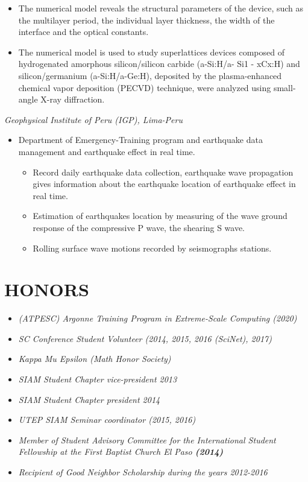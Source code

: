 \documentclass[margin]{res}
\begin{document}
\begin{resume}
\begin{itemize}
\begin{itemize}
\item The numerical model reveals the structural parameters of the device, such as the multilayer period, the individual layer thickness, the width of the interface and the optical constants. 
\item The numerical model is used to study superlattices devices composed of hydrogenated amorphous silicon/silicon carbide (a-Si:H/a- Si1 - xCx:H) and silicon/germanium (a-Si:H/a-Ge:H), deposited by the plasma-enhanced chemical vapor deposition (PECVD) technique, were
analyzed using small-angle X-ray diffraction.
\end{itemize}
\end{itemize} 
%
{\sl Geophysical Institute of Peru (IGP), Lima-Peru}%
\begin{itemize}\itemsep -2pt
\item Department of Emergency-Training program and earthquake data management and earthquake effect in real time.
\begin{itemize}
\item Record daily earthquake data collection, earthquake wave propagation gives information about the earthquake location of earthquake effect in real time.
\item Estimation of earthquakes location by measuring of the wave ground response of the compressive P wave, the shearing S wave.
\item Rolling surface wave motions recorded by seismographs stations.
\end{itemize}
\end{itemize} 

\section{HONORS} 
\begin{itemize}
 \item {\sl (ATPESC) Argonne Training Program in Extreme-Scale Computing (\it {2020})} %
 \item {\sl SC Conference Student Volunteer (\it {2014, 2015, 2016 (SciNet), 2017})} %
 \item {\sl Kappa Mu Epsilon (\it {Math Honor Society})} %
 \item {\sl SIAM Student Chapter vice-president 2013}
 \item {\sl SIAM Student Chapter president 2014} %
 \item {\sl UTEP SIAM Seminar coordinator (2015, 2016)}%
 \item {\sl Member of Student Advisory Committee for the International Student Fellowship at the First Baptist Church El Paso \bf (\it {2014})}%
 \item {\sl Recipient of Good Neighbor Scholarship during the years 2012-2016}   %
\end{itemize}


\end{resume}
\end{document}
